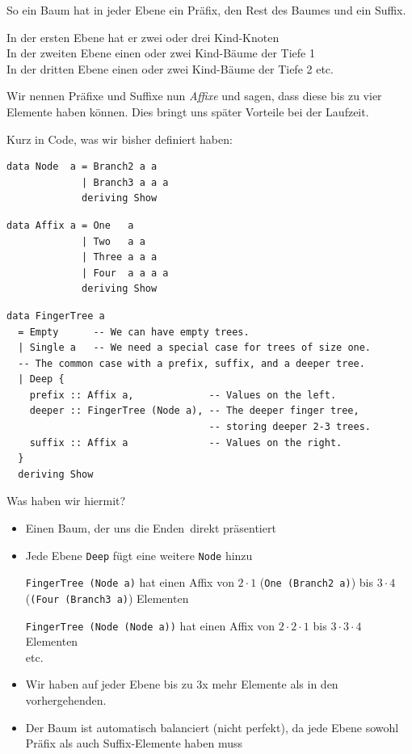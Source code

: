 \documentclass{beamer}
\begin{document}
\begin{frame}
So ein Baum hat in jeder Ebene ein Präfix, den Rest des Baumes und ein Suffix.\\\par\pause
In der ersten Ebene hat er zwei oder drei Kind-Knoten\\
In der zweiten Ebene einen oder zwei Kind-Bäume der Tiefe 1\\
In der dritten Ebene einen oder zwei Kind-Bäume der Tiefe 2 etc.\pause\bigskip

Wir nennen Präfixe und Suffixe nun \emph{Affixe} und sagen, dass diese bis zu vier Elemente haben können. Dies bringt uns später Vorteile bei der Laufzeit.
\end{frame}

\begin{frame}[fragile]
Kurz in Code, was wir bisher definiert haben:
\begin{verbatim}
data Node  a = Branch2 a a
             | Branch3 a a a
             deriving Show
\end{verbatim}
\pause
\begin{verbatim}
data Affix a = One   a
             | Two   a a
             | Three a a a
             | Four  a a a a
             deriving Show
\end{verbatim}
\pause
\begin{verbatim}
data FingerTree a 
  = Empty      -- We can have empty trees.
  | Single a   -- We need a special case for trees of size one.
  -- The common case with a prefix, suffix, and a deeper tree.
  | Deep {
    prefix :: Affix a,             -- Values on the left.
    deeper :: FingerTree (Node a), -- The deeper finger tree,
                                   -- storing deeper 2-3 trees.
    suffix :: Affix a              -- Values on the right.
  }
  deriving Show
\end{verbatim}
\end{frame}

\begin{frame}
Was haben wir hiermit?\\\par\pause
\begin{itemize}
 \item Einen Baum, der uns die \glqq Enden\grqq \ direkt präsentiert
 \pause
 \item Jede Ebene \texttt{Deep} fügt eine weitere \texttt{Node} hinzu\pause\smallskip
 
       \texttt{FingerTree (Node a)} hat einen Affix von $2\cdot 1$ (\texttt{One (Branch2 a)}) bis $3\cdot 4$ (\texttt{(Four (Branch3 a)}) Elementen\pause\smallskip
       
       \texttt{FingerTree (Node (Node a))} hat einen Affix von $2 \cdot 2\cdot 1$ bis $3 \cdot 3\cdot 4$ Elementen\\\pause
       etc.
 \pause
 \item Wir haben auf jeder Ebene bis zu 3x mehr Elemente als in den vorhergehenden.
 \pause
 \item Der Baum ist automatisch balanciert (nicht perfekt), da jede Ebene sowohl Präfix als auch Suffix-Elemente haben muss
\end{itemize}
\end{frame}
\end{document}
